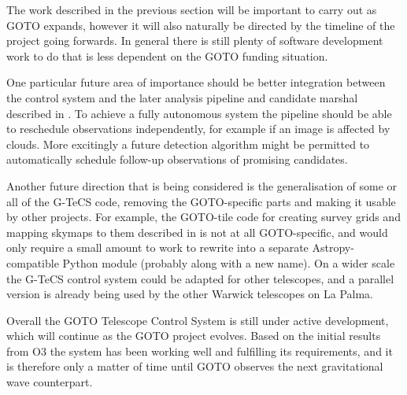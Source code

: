 \begin{colsection}
\begin{colsection}
The work described in the previous section will be important to carry out as GOTO expands, however it will also naturally be directed by the timeline of the project going forwards. In general there is still plenty of software development work to do that is less dependent on the GOTO funding situation.

One particular future area of importance should be better integration between the control system and the later analysis pipeline and candidate marshal described in . To achieve a fully autonomous system the pipeline should be able to reschedule observations independently, for example if an image is affected by clouds. More excitingly a future detection algorithm might be permitted to automatically schedule follow-up observations of promising candidates.

Another future direction that is being considered is the generalisation of some or all of the G-TeCS code, removing the GOTO-specific parts and making it usable by other projects. For example, the GOTO-tile code for creating survey grids and mapping skymaps to them described in  is not at all GOTO-specific, and would only require a small amount to work to rewrite into a separate Astropy-compatible Python module (probably along with a new name). On a wider scale the G-TeCS control system could be adapted for other telescopes, and a parallel version is already being used by the other Warwick telescopes on La Palma.

Overall the GOTO Telescope Control System is still under active development, which will continue as the GOTO project evolves. Based on the initial results from O3 the system has been working well and fulfilling its requirements, and it is therefore only a matter of time until GOTO observes the next gravitational wave counterpart.

\end{colsection}


\end{colsection}


